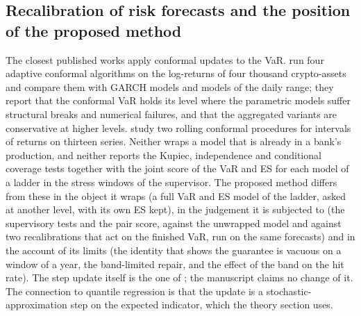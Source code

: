 \subsection{Recalibration of risk forecasts and the position of the proposed method}
\label{sec:rw-position}

The closest published works apply conformal updates to the VaR. \citet{fantazzini2024} run four adaptive conformal algorithms on the log-returns of four thousand crypto-assets and compare them with GARCH models and models of the daily range; they report that the conformal VaR holds its level where the parametric models suffer structural breaks and numerical failures, and that the aggregated variants are conservative at higher levels. \citet{aich2025} study two rolling conformal procedures for intervals of returns on thirteen series. Neither wraps a model that is already in a bank's production, and neither reports the Kupiec, independence and conditional coverage tests together with the joint score of the VaR and ES for each model of a ladder in the stress windows of the supervisor. The proposed method differs from these in the object it wraps (a full VaR and ES model of the ladder, asked at another level, with its own ES kept), in the judgement it is subjected to (the supervisory tests and the pair score, against the unwrapped model and against two recalibrations that act on the finished VaR, run on the same forecasts) and in the account of its limits (the identity that shows the guarantee is vacuous on a window of a year, the band-limited repair, and the effect of the band on the hit rate). The step update itself is the one of \citet{gibbs2021}; the manuscript claims no change of it. The connection to quantile regression \citep{koenker1978} is that the update is a stochastic-approximation step \citep{robbins1951} on the expected indicator, which the theory section uses.
